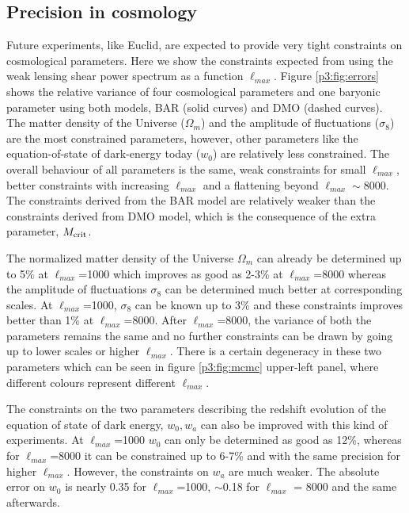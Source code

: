 \documentclass[
  11pt,
  twoside,
  openright,
  titlepage,
  headings=optiontoheadandtoc
]{scrbook}
\begin{document}


\subsection{Precision in cosmology}

Future experiments, like Euclid, are expected to provide very tight constraints on cosmological parameters. Here we show the constraints expected from using the weak lensing shear power spectrum as a function $\ell_{max}$. Figure \ref{p3:fig:errors} shows the relative variance of four cosmological parameters and one baryonic parameter using both models, BAR (solid curves) and DMO (dashed curves). The matter density of the Universe ($\Omega_m$) and the amplitude of fluctuations ($\sigma_8$) are the most constrained parameters, however, other parameters like the equation-of-state of dark-energy today ($w_0$) are relatively less constrained. The overall behaviour of all parameters is the same, weak constraints for small $\ell_{max}$, better constraints with increasing $\ell_{max}$ and a flattening beyond $\ell_{max}\sim 8000$. The constraints derived from the BAR model are relatively weaker than the constraints derived from DMO model, which is the consequence of the extra parameter, $M_{\rm crit}$. 

The normalized matter density of the Universe $\Omega_m$ can already be determined up to 5\% at $\ell_{max}$=1000 which improves as good as 2-3\% at $\ell_{max}$=8000 whereas the amplitude of fluctuations $\sigma_8$ can be determined much better at corresponding scales. At $\ell_{max}$=1000, $\sigma_8$ can be known up to 3\% and these constraints improves better than 1\% at $\ell_{max}$=8000. After $\ell_{max}$=8000, the variance of both the parameters remains the same and no further constraints can be drawn by going up to lower scales or higher $\ell_{max}$. There is a certain degeneracy in these two parameters which can be seen in figure \ref{p3:fig:mcmc} upper-left panel, where different colours represent different $\ell_{max}$.

The constraints on the two parameters describing the redshift evolution of the equation of state of dark energy, $w_0, w_a$ can also be improved with this kind of experiments. At $\ell_{max}$=1000 $w_0$ can only be determined as good as 12\%, whereas for $\ell_{max}$=8000 it can be constrained up to 6-7\% and with the same precision for higher $\ell_{max}$. However, the constraints on $w_a$ are much weaker. The absolute error on $w_0$ is nearly 0.35 for $\ell_{max}$=1000, $\sim$0.18 for $\ell_{max}$ = 8000 and the same afterwards. 
\end{document}
